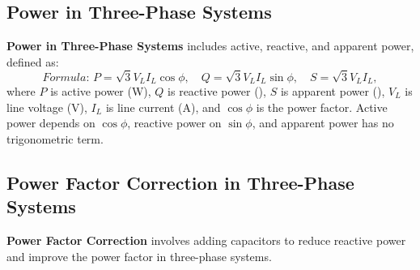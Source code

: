 \documentclass[12pt]{article}
\newcommand{\concept}[1]{\textbf{#1}}
\newcommand{\formula}[1]{\textit{Formula: }#1}
\begin{document}
\subsection{Power in Three-Phase Systems}
\concept{Power in Three-Phase Systems} includes active, reactive, and apparent power, defined as:
\[
\formula{P = \sqrt{3} V_L I_L \cos \phi, \quad Q = \sqrt{3} V_L I_L \sin \phi, \quad S = \sqrt{3} V_L I_L},
\]
where \(P\) is active power (\si{\watt}), \(Q\) is reactive power (\si{\voltampereactive}), \(S\) is apparent power (\si{\voltampere}), \(V_L\) is line voltage (\si{\volt}), \(I_L\) is line current (\si{\ampere}), and \(\cos \phi\) is the power factor. Active power depends on \(\cos \phi\), reactive power on \(\sin \phi\), and apparent power has no trigonometric term.
\subsection{Power Factor Correction in Three-Phase Systems}
\concept{Power Factor Correction} involves adding capacitors to reduce reactive power and improve the power factor in three-phase systems.
\end{document}
